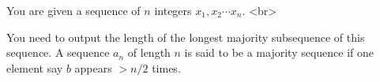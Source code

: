 You are given a sequence of $n$ integers $x_1, x_2 \cdots x_n$. <br>

You need to output the length of the longest majority subsequence of this sequence. A sequence $a_n$ of length $n$ is said to be 
a majority sequence if one element say $b$ appears $ > n/2$ times.

